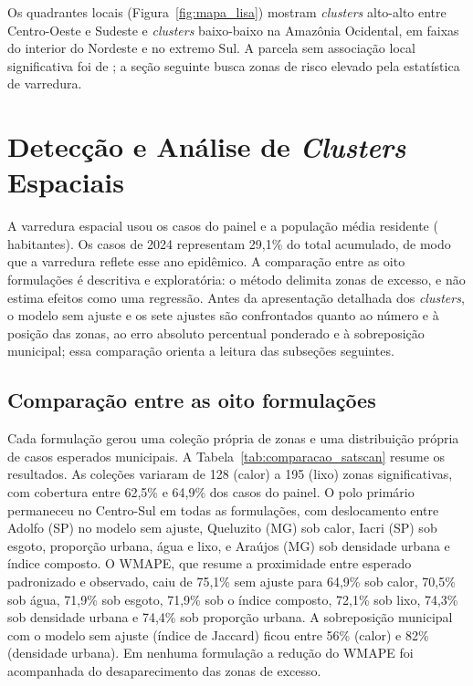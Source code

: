 Os quadrantes locais (Figura~\ref{fig:mapa_lisa}) mostram \textit{clusters} alto-alto entre Centro-Oeste e Sudeste e \textit{clusters} baixo-baixo na Amazônia Ocidental, em faixas do interior do Nordeste e no extremo Sul. A parcela sem associação local significativa foi de \LisaPctNS{}; a seção seguinte busca zonas de risco elevado pela estatística de varredura.

\section{Detecção e Análise de \textit{Clusters} Espaciais}
\label{sec:clusters}

A varredura espacial usou os \ScanTotalCasos{} casos do painel e a população média residente (\ScanPopulacao{} habitantes). Os casos de 2024 representam 29,1\% do total acumulado, de modo que a varredura reflete esse ano epidêmico. A comparação entre as oito formulações é descritiva e exploratória: o método delimita zonas de excesso, e não estima efeitos como uma regressão. Antes da apresentação detalhada dos \textit{clusters}, o modelo sem ajuste e os sete ajustes são confrontados quanto ao número e à posição das zonas, ao erro absoluto percentual ponderado e à sobreposição municipal; essa comparação orienta a leitura das subseções seguintes.

\subsection{Comparação entre as oito formulações}
\label{subsec:satscan_sensibilidade}

Cada formulação gerou uma coleção própria de zonas e uma distribuição própria de casos esperados municipais. A Tabela~\ref{tab:comparacao_satscan} resume os resultados. As coleções variaram de 128 (calor) a 195 (lixo) zonas significativas, com cobertura entre 62,5\% e 64,9\% dos casos do painel. O polo primário permaneceu no Centro-Sul em todas as formulações, com deslocamento entre Adolfo (SP) no modelo sem ajuste, Queluzito (MG) sob calor, Iacri (SP) sob esgoto, proporção urbana, água e lixo, e Araújos (MG) sob densidade urbana e índice composto. O WMAPE, que resume a proximidade entre esperado padronizado e observado, caiu de 75,1\% sem ajuste para 64,9\% sob calor, 70,5\% sob água, 71,9\% sob esgoto, 71,9\% sob o índice composto, 72,1\% sob lixo, 74,3\% sob densidade urbana e 74,4\% sob proporção urbana. A sobreposição municipal com o modelo sem ajuste (índice de Jaccard) ficou entre 56\% (calor) e 82\% (densidade urbana). Em nenhuma formulação a redução do WMAPE foi acompanhada do desaparecimento das zonas de excesso.

